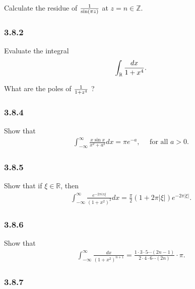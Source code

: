 Calculate the residue of \({1\over \sin(\pi z)}\) at
\(z=n\in {\mathbb{Z}}\).

\hypertarget{section-61}{%
\subsubsection{3.8.2}\label{section-61}}

Evaluate the integral
\begin{align*}
\int_{\mathbb{R}}{dx \over 1 + x^4}
.\end{align*}

What are the poles of \({1\over 1 + z^4}\) ?

\hypertarget{section-62}{%
\subsubsection{3.8.4}\label{section-62}}

Show that
\begin{align*}
\int_{-\infty}^{\infty} \frac{x \sin x}{x^{2}+a^{2}} d x=\pi e^{-a}, \quad \text { for all } a>0
.\end{align*}

\hypertarget{section-63}{%
\subsubsection{3.8.5}\label{section-63}}

Show that if \(\xi\in {\mathbb{R}}\), then
\begin{align*}
\int_{-\infty}^{\infty} \frac{e^{-2 \pi i x \xi}}{\left(1+x^{2}\right)^{2}} d x=\frac{\pi}{2}(1+2 \pi|\xi|) e^{-2 \pi|\xi|}
.\end{align*}

\hypertarget{section-64}{%
\subsubsection{3.8.6}\label{section-64}}

Show that
\begin{align*}
\int_{-\infty}^{\infty} \frac{d x}{\left(1+x^{2}\right)^{n+1}}=\frac{1 \cdot 3 \cdot 5 \cdots(2 n-1)}{2 \cdot 4 \cdot 6 \cdots(2 n)} \cdot \pi
.\end{align*}

\hypertarget{section-65}{%
\subsubsection{3.8.7}\label{section-65}}

